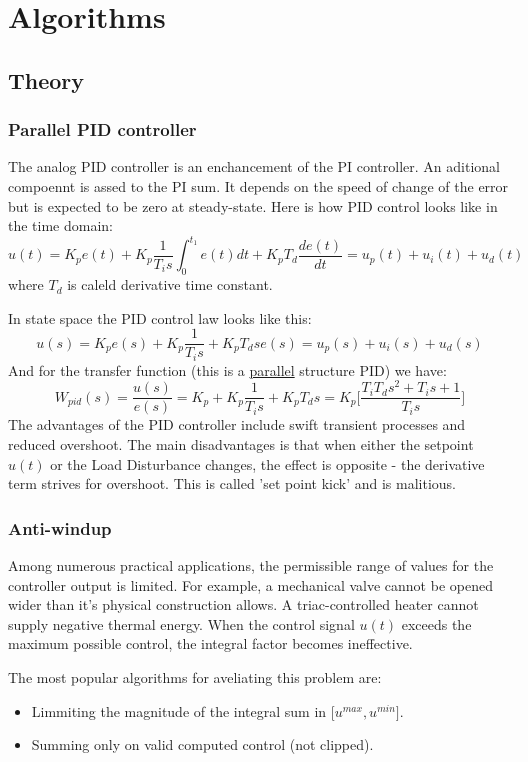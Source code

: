 \section{Algorithms}
\subsection{Theory}
\subsubsection{Parallel PID controller}
The analog PID controller is an enchancement of the PI controller.
An aditional compoennt is assed to the PI sum.
It depends on the speed of change of the error but is expected to be zero at steady-state.
Here is how PID control looks like in the time domain:
\begin{equation}
    u(t) = K_p e(t) + K_p \frac{1}{T_i s} \int_0^{t_1} e(t) dt + K_p T_d \frac{d e(t)}{dt} = u_p(t) + u_i(t) + u_d(t)
\end{equation}
where $T_d$ is caleld derivative time constant.
\par
In state space the PID control law looks like this:
\begin{equation}
    u(s) = K_p e(s) + K_p \frac{1}{T_i s} + K_p T_d s e(s) = u_p(s) + u_i(s) + u_d(s)
\end{equation}
And for the transfer function (this is a \underline{parallel} structure PID) we have:
\begin{equation}
    W_{pid}(s) = \frac{u(s)}{e(s)} = K_p + K_p \frac{1}{T_i s} + K_p T_d s =
    K_p \Bigg[ \frac{T_i T_d s^2 + T_i s + 1}{T_i s}  \Bigg]
\end{equation}
The advantages of the PID controller include swift transient processes and reduced overshoot.
The main disadvantages is that when either the setpoint $u(t)$ or the Load Disturbance changes,
the effect is opposite - the derivative term strives for overshoot.
This is called 'set point kick' and is malitious.

\subsubsection{Anti-windup}
Among numerous practical applications, the permissible range of values for the controller output is limited.
For example, a mechanical valve cannot be opened wider than it's physical construction allows.
A triac-controlled heater cannot supply negative thermal energy.
When the control signal $u(t)$ exceeds the maximum possible control, the integral factor becomes ineffective.
\par
The most popular algorithms for aveliating this problem are:
\begin{itemize}
\item{Limmiting the magnitude of the integral sum in [$u^{max}, u^{min}]$}.
\item{Summing only on valid computed control (not clipped). }
\end{itemize}

